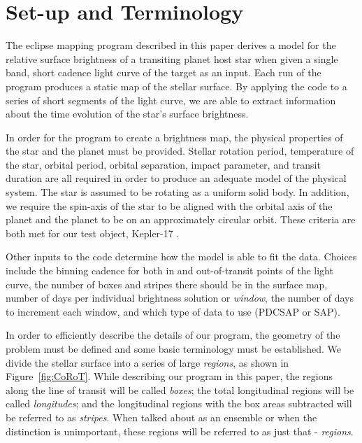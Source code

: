 

\section{Set-up and Terminology \label{terminology}}
The eclipse mapping program described in this paper derives a model for the relative surface brightness of a transiting planet host star when given a single band, short cadence light curve of the target as an input. Each run of the program produces a static map of the stellar surface. By applying the code to a series of short segments of the light curve, we are able to extract information about the time evolution of the star's surface brightness.  

In order for the program to create a brightness map, the physical properties of the star and the planet must be provided. Stellar rotation period, temperature of the star, orbital period, orbital separation, impact parameter, and transit duration are all required in order to produce an adequate model of the physical system. The star is assumed to be rotating as a uniform solid body. In addition, we require the spin-axis of the star  to be aligned with the orbital axis of the planet and the planet to be on an approximately circular orbit. These criteria are both met for our test object, Kepler-17 \cite{}.

Other inputs to the code determine how the model is able to fit the data. Choices include the binning cadence for both in and out-of-transit points of the light curve, the number of boxes and stripes there should be in the surface map, number of days per individual brightness solution or {\it window}, the number of days to increment each window, and which type of data to use (PDCSAP or SAP).

In order to efficiently describe the details of our program, the geometry of the problem must be defined and some basic terminology must be established. We divide the stellar surface into a series of large {\it regions}, as shown in Figure~\ref{fig:CoRoT}. While describing our program in this paper, the regions along the line of transit will be called {\it boxes}; the total longitudinal regions will be called {\it longitudes}; and the longitudinal regions with the box areas subtracted will be referred to as {\it stripes}. When talked about as an ensemble or when the distinction is unimportant, these regions will be referred to as just that - {\it regions}.


